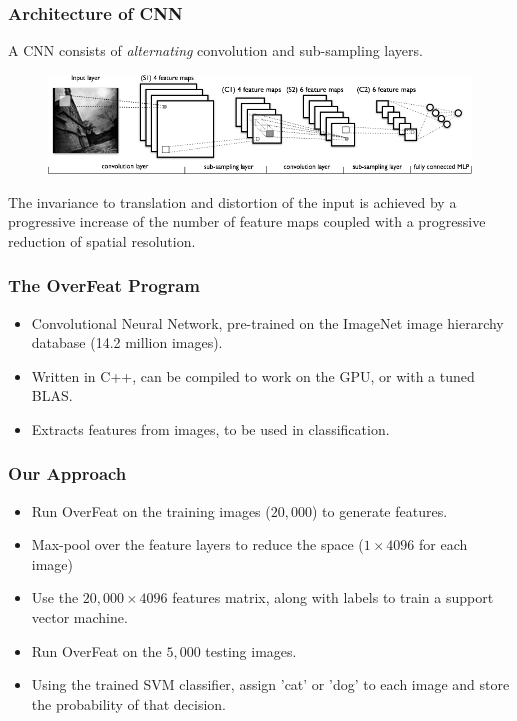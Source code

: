 \documentclass{beamer}
\begin{document}
\begin{frame}
\frametitle{Architecture of CNN} 
A CNN consists of \emph{alternating} convolution and sub-sampling layers. \vspace{0.3cm}
\begin{figure}
\includegraphics[width=0.9\linewidth]{CNN.jpeg}
\end{figure}
\vspace{0.4cm}
The invariance to translation and distortion of the input is achieved by a progressive increase of the number of feature maps coupled with a progressive reduction of spatial resolution. 
\end{frame}


\begin{frame}
\frametitle{The OverFeat Program} 
\begin{itemize}
\item Convolutional Neural Network, pre-trained on the ImageNet image hierarchy database (14.2 million images).
\item Written in C++, can be compiled to work on the GPU, or with a tuned BLAS.
\item Extracts features from images, to be used in classification.
\end{itemize}
\end{frame}

\begin{frame}
\frametitle{Our Approach} 
\begin{itemize}
\item Run OverFeat on the training images ($20,000$) to generate features.
\item Max-pool over the feature layers to reduce the space ($1 \times 4096$ for each image)
\item Use the $20,000 \times 4096$ features matrix, along with labels to train a support vector machine.
\item Run OverFeat on the $5,000$ testing images.
\item Using the trained SVM classifier, assign 'cat' or 'dog' to each image and store the probability of that decision.
\end{itemize}
\end{frame}
\end{document}
